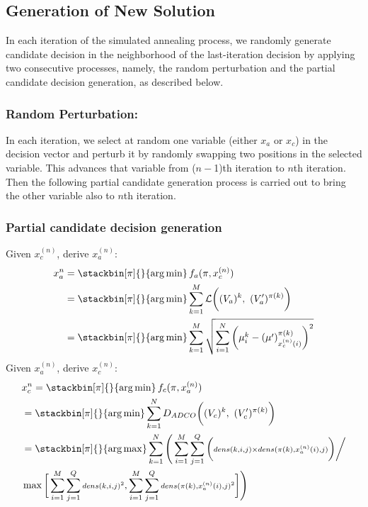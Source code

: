 \subsection{Generation of New Solution}
In each iteration of the simulated annealing process, we randomly generate candidate decision in the neighborhood of the last-iteration decision by applying two consecutive processes, namely, the random perturbation and the partial candidate decision generation, as described below.
\subsubsection{Random Perturbation:} In each iteration, we select at random one variable (either $x_a$ or $x_c$) in the decision vector and perturb it by randomly swapping two positions in the selected variable. This advances that variable from ($n-$1)th iteration to $n$th iteration. Then the following partial candidate generation process is carried out to bring the other variable also to $n$th iteration.
\subsubsection{Partial candidate decision generation}
\label{sec:new_sols}
Given $x_c^{(n)}$, derive $x_a^{(n)}$:
\begin{align}
\notag x_a^n&=\stackbin[\pi]{}{\argmin}\,f_a(\pi,x_c^{(n)})\\
\notag &=\stackbin[\pi]{}{\argmin}\sum_{k=1}^M\mathcal{L}\bigg((V_a)^k,~(V_a')^{\pi(k)}\bigg)\\
&=\stackbin[\pi]{}{\argmin}\sum_{k=1}^M\sqrt{\sum_{i=1}^N\bigg(\mu^{k}_i-(\mu')^{\pi(k)}_{x_c^{(n)}(i)}\bigg)^2} \label{eq:gen_xa}
\end{align}
Given $x_a^{(n)}$, derive $x_c^{(n)}$:
\begin{align}
\notag &x_c^n=\stackbin[\pi]{}{\argmin}\,f_c(\pi,x_a^{(n)})\\
\notag &=\stackbin[\pi]{}{\argmin}\sum_{k=1}^N D_{ADCO}\bigg((V_c)^k,~(V_c')^{\pi(k)}\bigg)\\
\notag &=\stackbin[\pi]{}{\argmax}\sum_{k=1}^N\Bigg(\displaystyle \sum_{i=1}^M\sum_{j=1}^Q \bigg({\scriptstyle dens(k,i,j)\times dens(\pi(k),x_a^{(n)}(i),j)}\bigg) \bigg/\\
&\max{\bigg[\sum_{i=1}^M\sum_{j=1}^Q {\scriptstyle dens(k,i,j)^2},\sum_{i=1}^M\sum_{j=1}^Q {\scriptstyle dens(\pi(k),x_a^{(n)}(i),j)^2}\bigg]}\Bigg) \label{eq:gen_xc}
\end{align}

